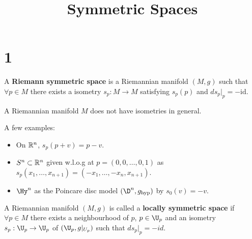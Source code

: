\documentclass[10pt,a4paper]{article}
\title{Symmetric Spaces}
\date{}
\begin{document}
\maketitle	
\section{1}
\begin{defn}
A \textbf{Riemann symmetric space} is a Riemannian manifold $(M,g)$ such that $\forall p\in M$ there exists a isometry $s_p: M\to M$ satisfying $s_p(p)$ and $ds_p\vert_p = -\text{id}$.
\end{defn}

\begin{remark}
A Riemannian manifold $M$ does not have isometries in general.
\end{remark}

A few examples:

\begin{example}
\begin{itemize}
\item On $\mathbb{R}^n$, $s_p(p+v) = p-v$.
\item $S^n\subset \mathbb{R}^n$ given w.l.o.g at $p=(0,0,\ldots,0,1)$ as $s_p(x_1,\ldots,x_{n+1}) = (-x_1,\ldots,-x_n,x_{n+1})$.
\item $\Hy^n$ as the Poincare disc model $(\D^n,g_\text{hyp})$ by $s_0(v) = -v$.
\end{itemize}
\end{example}

\begin{defn}
A Riemannian manifold $(M,g)$ is called a \textbf{locally symmetric space} if $\forall p\in M$ there exists a neighbourhood of $p$, $p\in \U_p$ and an isometry $s_p:\U_p\to \U_p$ of $(\U_p,g\vert_{U_p})$ such that $ds_p\vert_p = -id$.
\end{defn}
\end{document}
